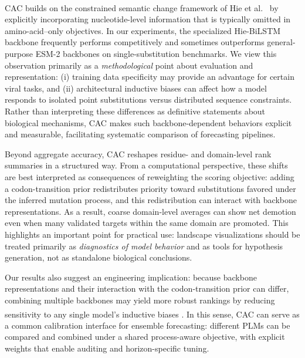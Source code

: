 \documentclass[pdflatex,sn-nature]{sn-jnl}
\renewcommand\cite[1]{\unskip\textsuperscript{\citep{#1}}}
\begin{document}
CAC builds on the constrained semantic change framework of Hie et al.~\cite{hie2021learning} by explicitly incorporating nucleotide-level information that is typically omitted in amino-acid--only objectives. In our experiments, the specialized Hie-BiLSTM backbone frequently performs competitively and sometimes outperforms general-purpose ESM-2 backbones on single-substitution benchmarks. We view this observation primarily as a \emph{methodological} point about evaluation and representation: (i) training data specificity may provide an advantage for certain viral tasks, and (ii) architectural inductive biases can affect how a model responds to isolated point substitutions versus distributed sequence constraints. Rather than interpreting these differences as definitive statements about biological mechanisms, CAC makes such backbone-dependent behaviors explicit and measurable, facilitating systematic comparison of forecasting pipelines.

Beyond aggregate accuracy, CAC reshapes residue- and domain-level rank summaries in a structured way. From a computational perspective, these shifts are best interpreted as consequences of reweighting the scoring objective: adding a codon-transition prior redistributes priority toward substitutions favored under the inferred mutation process, and this redistribution can interact with backbone representations. As a result, coarse domain-level averages can show net demotion even when many validated targets within the same domain are promoted. This highlights an important point for practical use: landscape visualizations should be treated primarily as \emph{diagnostics of model behavior} and as tools for hypothesis generation, not as standalone biological conclusions.

Our results also suggest an engineering implication: because backbone representations and their interaction with the codon-transition prior can differ, combining multiple backbones may yield more robust rankings by reducing sensitivity to any single model's inductive biases \cite{Botz2024dynamic}. In this sense, CAC can serve as a common calibration interface for ensemble forecasting: different PLMs can be compared and combined under a shared process-aware objective, with explicit weights that enable auditing and horizon-specific tuning.
\end{document}
